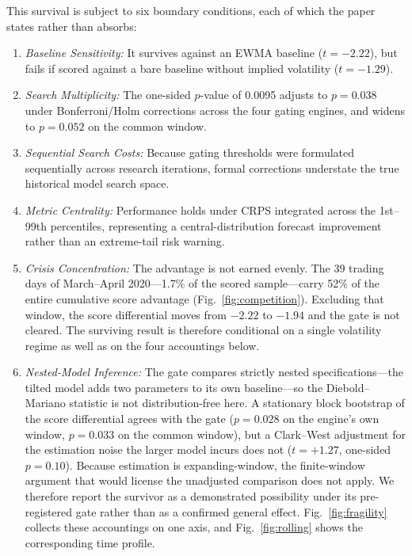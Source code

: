 \documentclass{ieeeaccess}
\begin{document}
This survival is subject to six boundary conditions, each of which the paper states rather than absorbs:
\begin{enumerate}
    \item \textit{Baseline Sensitivity:} It survives against an EWMA baseline ($t = -2.22$), but fails if scored against a bare baseline without implied volatility ($t = -1.29$).
    \item \textit{Search Multiplicity:} The one-sided $p$-value of 0.0095 adjusts to $p = 0.038$ under Bonferroni/Holm corrections across the four gating engines, and widens to $p = 0.052$ on the common window.
    \item \textit{Sequential Search Costs:} Because gating thresholds were formulated sequentially across research iterations, formal corrections understate the true historical model search space.
    \item \textit{Metric Centrality:} Performance holds under CRPS integrated across the 1st--99th percentiles, representing a central-distribution forecast improvement rather than an extreme-tail risk warning.
    \item \textit{Crisis Concentration:} The advantage is not earned evenly. The 39 trading days of March--April 2020---1.7\% of the scored sample---carry 52\% of the entire cumulative score advantage (Fig.~\ref{fig:competition}). Excluding that window, the score differential moves from $-2.22$ to $-1.94$ and the gate is not cleared. The surviving result is therefore conditional on a single volatility regime as well as on the four accountings below.
    \item \textit{Nested-Model Inference:} The gate compares strictly nested specifications---the tilted model adds two parameters to its own baseline---so the Diebold--Mariano statistic is not distribution-free here. A stationary block bootstrap of the score differential agrees with the gate ($p = 0.028$ on the engine's own window, $p = 0.033$ on the common window), but a Clark--West adjustment for the estimation noise the larger model incurs does not ($t = +1.27$, one-sided $p = 0.10$). Because estimation is expanding-window, the finite-window argument that would license the unadjusted comparison does not apply. We therefore report the survivor as a demonstrated possibility under its pre-registered gate rather than as a confirmed general effect. Fig.~\ref{fig:fragility} collects these accountings on one axis, and Fig.~\ref{fig:rolling} shows the corresponding time profile.
\end{enumerate}
\end{document}
